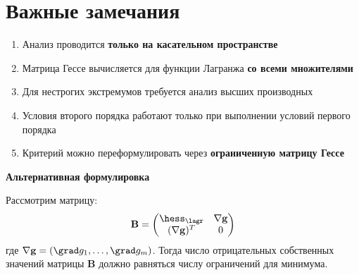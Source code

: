 \section*{Важные замечания}
\begin{enumerate}
    \item Анализ проводится \textbf{только на касательном пространстве}
    
    \item Матрица Гессе вычисляется для функции Лагранжа \textbf{со всеми множителями}
    
    \item Для нестрогих экстремумов требуется анализ высших производных
    
    \item Условия второго порядка работают только при выполнении условий первого порядка
    
    \item Критерий можно переформулировать через \textbf{ограниченную матрицу Гессе}
\end{enumerate}

\begin{center}
\large\textbf{Альтернативная формулировка}
\end{center}
Рассмотрим матрицу:
\[
\mathbf{B} = \begin{pmatrix}
\hess_{\lagr} & \nabla \mathbf{g} \\
(\nabla \mathbf{g})^T & 0
\end{pmatrix}
\]
где $\nabla \mathbf{g} = (\grad g_1, \dots, \grad g_m)$. Тогда число отрицательных собственных значений матрицы $\mathbf{B}$ должно равняться числу ограничений для минимума.

